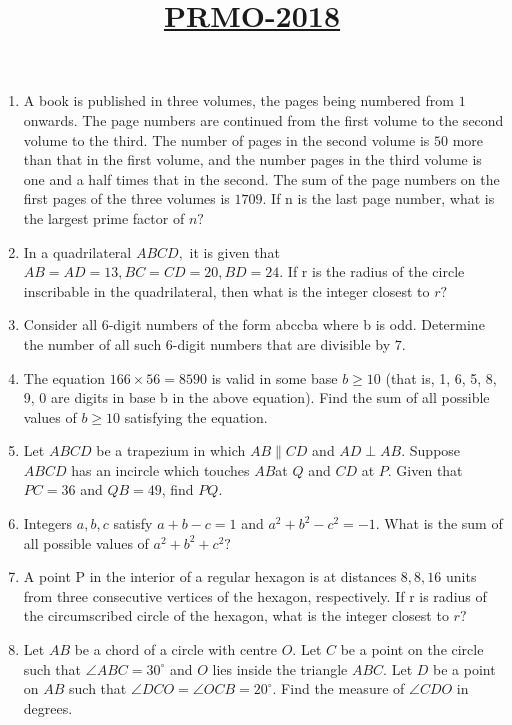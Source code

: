 \documentclass{article}
\title{\underline{PRMO-2018}}
\date{}
\begin{document}
                                                                                                               
\maketitle                                                                                                                     
\begin{enumerate}
\item A book is published in three volumes, the pages being numbered from $1$ onwards. The page numbers are continued from the first volume to the second volume to the third. The number of pages in the second volume is $50$ more than that in the first volume, and the number pages in the third volume is one and a half times that in the second. The sum of the page numbers on the first pages of the three volumes is $1709.$ If n is the last page number, what is the largest prime factor of $n?$ 
\item  In a quadrilateral $ABCD,$ it is given that$ AB = AD = 13,BC = CD = 20,BD = 24.$ If r is the radius of the circle inscribable in the quadrilateral, then what is the integer closest to $r?$
\item  Consider all $6$-digit numbers of the form abccba where b is odd. Determine the number of all such $6$-digit numbers that are divisible by $7.$ 
\item The equation $166 \times 56 = 8590$ is valid in some base $b \geq 10$ (that is, 1, 6, 5, 8, 9, 0 are digits in base b in the above equation). Find the sum of all possible values of $ b \geq 10 $ satisfying the equation. 
\item  Let $ ABCD $ be a trapezium in which $ AB \parallel CD $ and $AD \perp AB.$ Suppose $ABCD$ has an incircle which touches $ AB $at $ Q$ and $ CD $ at $P$. Given that $PC = 36$ and $QB = 49$, find $PQ.$ 
\item Integers $a, b, c$ satisfy $a + b - c =1$ and $a^{2} + b^{2} - c^{2} = -1.$ What is the sum of all possible values of $a^{2} + b^{2} + c^{2}?$
\item  A point P in the interior of a regular hexagon is at distances $8,8,16$ units from three consecutive vertices of the hexagon, respectively. If r is radius of the circumscribed circle of the hexagon, what is the integer closest to $r?$ 
\item  Let $AB$ be a chord of a circle with centre $O.$ Let $C$ be a point on the circle such that $\angle{ABC} = 30^{\circ}$ and $O$ lies inside the triangle $ABC.$ Let $D$ be a point on $AB$ such that $\angle{DCO} = \angle{OCB} = 20^{\circ}$. Find the measure of $\angle{CDO}$ in degrees. 

\end{enumerate}
\end{document}
